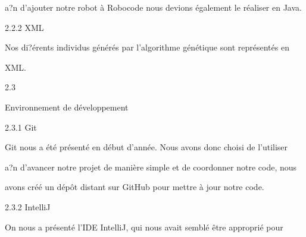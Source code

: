 \documentclass[a4paper,portrait,12pt]{article}
\begin{document}
\begin{flushleft}
a?n d'ajouter notre robot \`{a} Robocode nous devions \'{e}galement le r\'{e}aliser en Java.
\end{flushleft}





\begin{flushleft}
2.2.2 XML
\end{flushleft}


\begin{flushleft}
Nos di?\'{e}rents individus g\'{e}n\'{e}r\'{e}s par l'algorithme g\'{e}n\'{e}tique sont repr\'{e}sent\'{e}s en
\end{flushleft}


\begin{flushleft}
XML.
\end{flushleft}


2.3





\begin{flushleft}
Environnement de d\'{e}veloppement
\end{flushleft}





\begin{flushleft}
2.3.1 Git
\end{flushleft}


\begin{flushleft}
Git nous a \'{e}t\'{e} pr\'{e}sent\'{e} en d\'{e}but d'ann\'{e}e. Nous avons donc choisi de l'utiliser
\end{flushleft}


\begin{flushleft}
a?n d'avancer notre projet de mani\`{e}re simple et de coordonner notre code, nous
\end{flushleft}


\begin{flushleft}
avons cr\'{e}\'{e} un d\'{e}p\^{o}t distant sur GitHub pour mettre \`{a} jour notre code.
\end{flushleft}





\begin{flushleft}
2.3.2 IntelliJ
\end{flushleft}


\begin{flushleft}
On nous a pr\'{e}sent\'{e} l'IDE IntelliJ, qui nous avait sembl\'{e} \^{e}tre appropri\'{e} pour
\end{flushleft}
\end{document}
